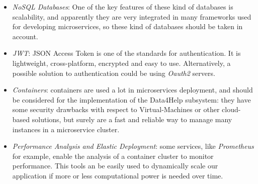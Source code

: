 \begin{itemize}
	\item  \textit{NoSQL Databases}: One of the key features of these kind of databases is scalability, and apparently they are very integrated in many frameworks used for developing microservices, so these kind of databases should be taken in account.
	\item  \textit{JWT}: JSON Access Token is one of the standards for authentication. It is lightweight, cross-platform, encrypted and easy to use. Alternatively, a possible solution to authentication could be using \textit{Oauth2} servers.
	\item  \textit{Containers}: containers are used a lot in microservices deployment, and should be considered for the implementation of the Data4Help subsystem: they have some security drawbacks with respect to Virtual-Machines or other cloud-based solutions, but surely are a fast and reliable way to manage many instances in a microservice cluster.
	\item  \textit{Performance Analysis and Elastic Deployment}: some services, like \textit{Prometheus} for example, enable the analysis of a container cluster to monitor performance. This tools an be easily used to dynamically scale our application if more or less computational power is needed over time.
\end{itemize}